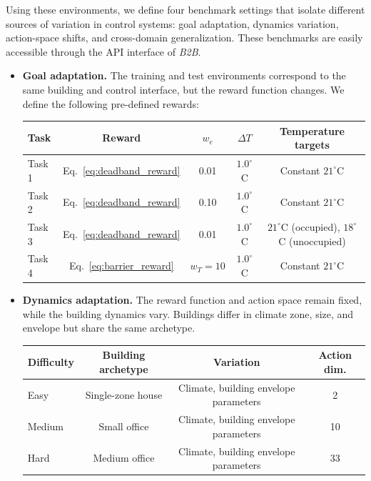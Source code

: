 \documentclass[10pt]{article} %
\newcommand{\btob}{{\textit{B2B}}}
\begin{document}
Using these environments, we define four benchmark settings that isolate different sources of variation in control systems: goal adaptation, dynamics variation, action-space shifts, and cross-domain generalization. These benchmarks are easily accessible through the API interface of \btob{}.

\begin{itemize}

\item \textbf{Goal adaptation.}  
The training and test environments correspond to the same building and control interface, but the reward function changes. We define the following pre-defined rewards:

\begin{table}[h]
\centering
\small
\begin{tabular}{lcccc}
\toprule
\textbf{Task} & \textbf{Reward} & $w_e$ & $\Delta T$ & \textbf{Temperature targets} \\
\midrule
Task 1 & Eq.~\ref{eq:deadband_reward} & 0.01 & $1.0^\circ$C & Constant $21^\circ$C \\
Task 2 & Eq.~\ref{eq:deadband_reward} & 0.10 & $1.0^\circ$C & Constant $21^\circ$C \\
Task 3 & Eq.~\ref{eq:deadband_reward} & 0.01 & $1.0^\circ$C & $21^\circ$C (occupied), $18^\circ$C (unoccupied) \\
Task 4 & Eq.~\ref{eq:barrier_reward} & $w_T=10$ & $1.0^\circ$C & Constant $21^\circ$C \\
\bottomrule
\end{tabular}
\end{table}


\item \textbf{Dynamics adaptation.}  The reward function and action space remain fixed, while the building dynamics vary. Buildings differ in climate zone, size, and envelope but share the same archetype.

\begin{table}[h!]
\centering
\small
\begin{tabular}{lccc}
\toprule
\textbf{Difficulty} & \textbf{Building archetype} & \textbf{Variation} & \textbf{Action dim.} \\
\midrule
Easy   & Single-zone house & Climate, building envelope parameters & 2 \\
Medium & Small office      & Climate, building envelope parameters & 10 \\
Hard   & Medium office     & Climate, building envelope parameters & 33 \\
\bottomrule
\end{tabular}
\end{table}


\end{itemize}
\end{document}
